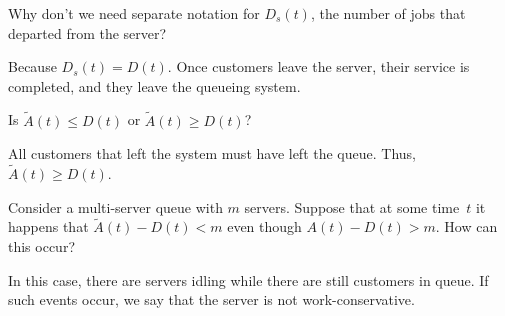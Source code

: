 \begin{extra}
  Why don't we need separate notation for $D_s(t)$, the number of jobs that departed from the server?
\begin{solution}
 Because $D_s(t) = D(t)$. Once customers leave the server,
    their service is completed, and they leave the queueing system.
  \end{solution}
\end{extra}

\begin{extra}
 Is $\tilde A(t) \leq D(t)$ or $\tilde A(t) \geq D(t)$?
\begin{solution}
 All customers that left the system must have left the
    queue. Thus, $\tilde A(t) \geq D(t)$.
  \end{solution}
\end{extra}



\begin{extra}
  Consider a multi-server queue with $m$ servers.
  Suppose that at some time~$t$ it happens that $\tilde A(t) - D(t) < m$ even though $A(t) - D(t) > m$.
  How can this occur?
\begin{solution}
 In this case, there are servers idling while there are still
    customers in queue. If such events occur, we say that the server
    is not work-conservative.
\end{solution}
\end{extra}


